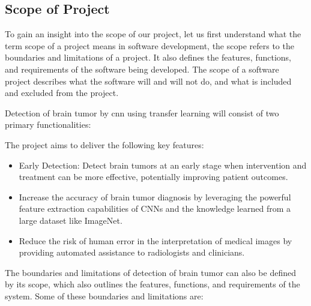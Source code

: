 \subsection{Scope of Project}

To gain an insight into the scope of our project, let us first understand what the term scope of a project means in software development, the scope refers to the boundaries and limitations of a project. It also defines the features, functions, and requirements of the software being developed. The scope of a software project describes what the software will and will not do, and what is included and excluded from the project. 

Detection of  brain tumor by cnn using transfer learning will consist of two primary functionalities:  

The project aims to deliver the following key features:

\begin{itemize}
    \item  Early Detection: Detect brain tumors at an early stage when intervention and treatment can be more effective, potentially improving patient outcomes.
\vspace{0.5cm}
    \item  Increase the accuracy of brain tumor diagnosis by leveraging the powerful feature extraction capabilities of CNNs and the knowledge learned from a large dataset like ImageNet.
    \item  Reduce the risk of human error in the interpretation of medical images by providing automated assistance to radiologists and clinicians.
\end{itemize}


The boundaries and limitations of detection of brain tumor can also be defined by its scope, which also outlines the features, functions, and requirements of the system. Some of these boundaries and limitations are:

